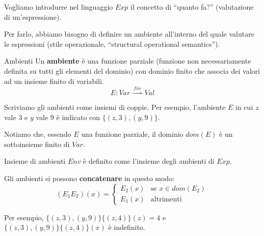 \documentclass[a4paper,11pt]{report}
\begin{document}
Vogliamo introdurre nel linguaggio \( Exp \) il concetto di ``quanto fa?'' (valutazione di un'espressione).

Per farlo, abbiamo bisogno di definire un ambiente all'interno del quale valutare le espressioni (stile operazionale, ``structural operational semantics'').

\begin{defbox}{Ambienti}{}
    Un \textbf{ambiente} è una funzione parziale (funzione non necessariamente definita su tutti gli elementi del dominio) con dominio finito che associa dei valori ad un insieme finito di variabili.
    \[ E : Var \ \overset{fin}{\rightharpoonup} \ Val  \]

    Scriviamo gli ambienti come insiemi di coppie. Per esempio, l'ambiente \( E \) in cui \( z \) vale \( 3 \) e \( y \) vale \( 9 \) è indicato con \( \{(z, 3), (y, 9)\} \).

    Notiamo che, essendo \( E \) una funzione parziale, il dominio \( dom(E) \) è un sottoinsieme finito di \( Var \).

    \begin{defbox}[colframe=DarkOrchid, colbacktitle=DarkOrchid]{Insieme di ambienti}{}
        \( Env \) è definito come l'insieme degli ambienti di \( Exp \).

    \end{defbox}

\end{defbox}

\vspace{0.5em}

Gli ambienti si possono \textbf{concatenare} in questo modo:
\[ (E_1 E_2)(x) = \begin{cases}
    E_2(x) & \text{se } x\in dom(E_2) \\
    E_1(x) & \text{altrimenti}
\end{cases}
\]

Per esempio, \( \{(z, 3), (y, 9)\}\{(z, 4)\}(z) = 4 \) e \( \{(z, 3), (y, 9)\}\{(z, 4)\}(x) \) è indefinito.

\vspace{0.5em}
\end{document}

